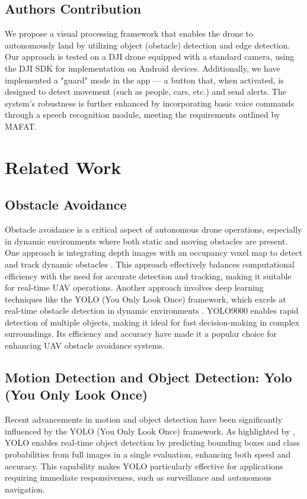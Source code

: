 \documentclass[3p,times]{elsarticle}
\begin{document}
\subsection{Authors Contribution}
We propose a visual processing framework that enables the drone to autonomously land by utilizing object (obstacle) detection and edge detection. Our approach is tested on a DJI drone equipped with a standard camera, using the DJI SDK for implementation on Android devices. Additionally, we have implemented a "guard" mode in the app — a button that, when activated, is designed to detect movement (such as people, cars, etc.) and send alerts. The system's robustness is further enhanced by incorporating basic voice commands through a speech recognition module, meeting the requirements outlined by MAFAT.\\

\section{Related Work} \label{sec:related}
\subsection{Obstacle Avoidance}
Obstacle avoidance is a critical aspect of autonomous drone operations, especially in dynamic environments where both static and moving obstacles are present. One approach is integrating depth images with an occupancy voxel map to detect and track dynamic obstacles \cite{xu2023real}. This approach effectively balances computational efficiency with the need for accurate detection and tracking, making it suitable for real-time UAV operations. Another approach involves deep learning techniques like the YOLO (You Only Look Once) framework, which excels at real-time obstacle detection in dynamic environments \cite{redmon2017yolo9000}. YOLO9000 enables rapid detection of multiple objects, making it ideal for fast decision-making in complex surroundings. Its efficiency and accuracy have made it a popular choice for enhancing UAV obstacle avoidance systems.

\subsection{Motion Detection and Object Detection: Yolo (You Only Look Once)}
Recent advancements in motion and object detection have been significantly influenced by the YOLO (You Only Look Once) framework. As highlighted by \cite{dahirou2021motion}, YOLO enables real-time object detection by predicting bounding boxes and class probabilities from full images in a single evaluation, enhancing both speed and accuracy. This capability makes YOLO particularly effective for applications requiring immediate responsiveness, such as surveillance and autonomous navigation.
\end{document}
